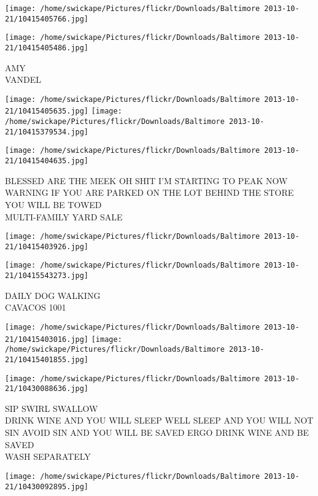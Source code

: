 \documentclass[10pt,letterpaper]{article}
\begin{document}
\texttt{[image: /home/swickape/Pictures/flickr/Downloads/Baltimore 2013-10-21/10415405766.jpg]}

\vspace{0.25in}
\texttt{[image: /home/swickape/Pictures/flickr/Downloads/Baltimore 2013-10-21/10415405486.jpg]}

AMY\\
VANDEL
\pagebreak

\texttt{[image: /home/swickape/Pictures/flickr/Downloads/Baltimore 2013-10-21/10415405635.jpg]}
\texttt{[image: /home/swickape/Pictures/flickr/Downloads/Baltimore 2013-10-21/10415379534.jpg]}

\texttt{[image: /home/swickape/Pictures/flickr/Downloads/Baltimore 2013-10-21/10415404635.jpg]}

BLESSED ARE THE MEEK OH SHIT I'M STARTING TO PEAK NOW\\
WARNING IF YOU ARE PARKED ON THE LOT BEHIND THE STORE YOU WILL BE TOWED\\
MULTI{-}FAMILY YARD SALE
\pagebreak

\texttt{[image: /home/swickape/Pictures/flickr/Downloads/Baltimore 2013-10-21/10415403926.jpg]}

\vspace{0.25in}
\texttt{[image: /home/swickape/Pictures/flickr/Downloads/Baltimore 2013-10-21/10415543273.jpg]}

DAILY DOG WALKING\\
CAVACOS 1001
\pagebreak

\texttt{[image: /home/swickape/Pictures/flickr/Downloads/Baltimore 2013-10-21/10415403016.jpg]}
\texttt{[image: /home/swickape/Pictures/flickr/Downloads/Baltimore 2013-10-21/10415401855.jpg]}

\vspace{0.25in}
\texttt{[image: /home/swickape/Pictures/flickr/Downloads/Baltimore 2013-10-21/10430088636.jpg]}

SIP SWIRL SWALLOW\\
DRINK WINE AND YOU WILL SLEEP WELL SLEEP AND YOU WILL NOT SIN AVOID SIN AND YOU WILL BE SAVED ERGO DRINK WINE AND BE SAVED\\
WASH SEPARATELY
\pagebreak

\texttt{[image: /home/swickape/Pictures/flickr/Downloads/Baltimore 2013-10-21/10430092895.jpg]}
\end{document}
